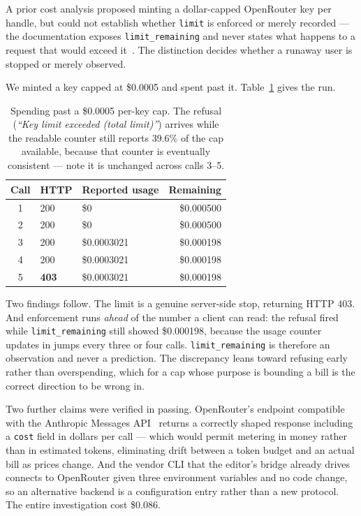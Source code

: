 \documentclass[10pt,letterpaper,twocolumn]{article}
\newcommand{\code}[1]{\texttt{#1}}
\begin{document}
A prior cost analysis proposed minting a dollar-capped OpenRouter key per handle,
but could not establish whether \code{limit} is enforced or merely recorded ---
the documentation exposes \code{limit\_remaining} and never states what happens
to a request that would exceed it~\citep{openrouterkeys}. The distinction decides whether a runaway user
is stopped or merely observed.

We minted a key capped at \$0.0005 and spent past it. Table~\ref{tab:probe} gives
the run.

\begin{table}[t]
\centering
\footnotesize
\begin{tabularx}{\columnwidth}{@{}clXr@{}}
\toprule
\textbf{Call} & \textbf{HTTP} & \textbf{Reported usage} & \textbf{Remaining} \\
\midrule
1 & 200 & \$0         & \$0.000500 \\
2 & 200 & \$0         & \$0.000500 \\
3 & 200 & \$0.0003021 & \$0.000198 \\
4 & 200 & \$0.0003021 & \$0.000198 \\
5 & \textbf{403} & \$0.0003021 & \$0.000198 \\
\bottomrule
\end{tabularx}
\caption{Spending past a \$0.0005 per-key cap. The refusal
(\emph{``Key limit exceeded (total limit)''}) arrives while the readable counter
still reports 39.6\% of the cap available, because that counter is eventually
consistent --- note it is unchanged across calls 3--5.}
\label{tab:probe}
\end{table}

Two findings follow. The limit is a genuine server-side stop, returning HTTP 403.
And enforcement runs \emph{ahead} of the number a client can read: the refusal
fired while \code{limit\_remaining} still showed \$0.000198, because the usage
counter updates in jumps every three or four calls. \code{limit\_remaining} is
therefore an observation and never a prediction. The discrepancy leans toward
refusing early rather than overspending, which for a cap whose purpose is
bounding a bill is the correct direction to be wrong in.

Two further claims were verified in passing. OpenRouter's endpoint compatible with the Anthropic
Messages API~\citep{anthropicmessages} returns a correctly shaped response including a
\code{cost} field in dollars per call --- which would permit metering in money
rather than in estimated tokens, eliminating drift between a token budget and an
actual bill as prices change. And the vendor CLI that the editor's bridge already
drives connects to OpenRouter given three environment variables and no code
change, so an alternative backend is a configuration entry rather than a new
protocol. The entire investigation cost \$0.086.
\end{document}
